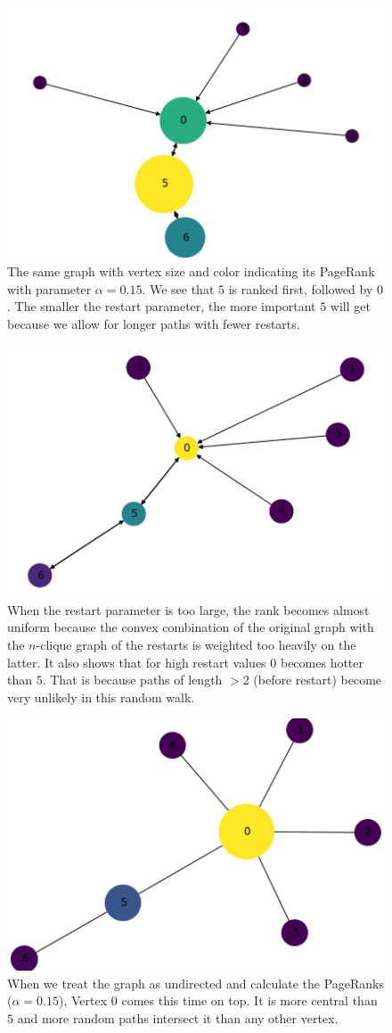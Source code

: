 \documentclass[a4paper,10pt]{article}
\newcommand{\gt}{>}
\theoremstyle{definition}
\theoremstyle{remark}
\theoremstyle{plain}
\begin{document}
\begin{figure}[!htb]
  \centering
    \includegraphics[width=0.55\linewidth]{directed_graph_example.png}
  \caption{The same graph with vertex size and color indicating its PageRank
  with parameter $\alpha=0.15$. We see that $5$ is ranked first, followed by
  $0$. The smaller the restart parameter, the more important $5$ will get
  because we allow for longer paths with fewer restarts.}
  \label{fig:weaklyconnectedpagedranked}
\end{figure}

\begin{figure}[!htb]
  \centering
    \includegraphics[width=0.55\linewidth]{directed_graph_example_tinyalpha.png}
  \caption{When the restart parameter is too large, the rank becomes almost
  uniform because the convex combination of the original graph with the
  $n$-clique graph of the restarts is weighted too heavily on the latter. It
  also shows that for high restart values $0$ becomes hotter than $5$. That is
  because paths of length $\gt 2$ (before restart) become very unlikely in this random walk.}
  \label{fig:weaklyconnectedpagedrankedbadly}
\end{figure}

\begin{figure}[!htb]
  \centering
    \includegraphics[width=0.55\linewidth]{undirected_graph_example.png}
  \caption{When we treat the graph as undirected and calculate the PageRanks
  ($\alpha=0.15$),
  Vertex $0$ comes this time on top. It is more central than $5$ and
  more random paths intersect it than any other vertex.}
  \label{fig:undirectedanked}
\end{figure}
\end{document}
